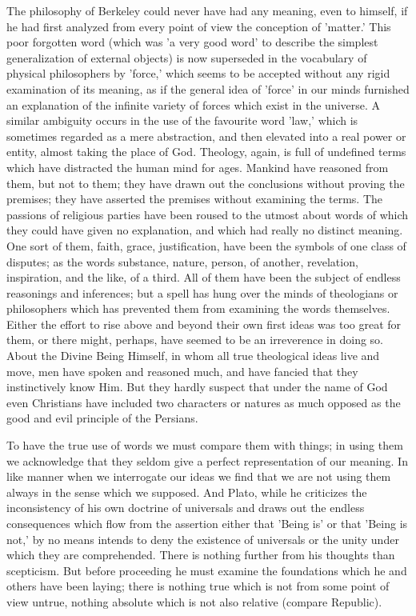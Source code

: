 The philosophy of Berkeley could never have had any meaning, even
to himself, if he had first analyzed from every point of view the
conception of 'matter.' This poor forgotten word (which was 'a very good
word' to describe the simplest generalization of external objects) is
now superseded in the vocabulary of physical philosophers by 'force,'
which seems to be accepted without any rigid examination of its meaning,
as if the general idea of 'force' in our minds furnished an explanation
of the infinite variety of forces which exist in the universe. A similar
ambiguity occurs in the use of the favourite word 'law,' which is
sometimes regarded as a mere abstraction, and then elevated into a real
power or entity, almost taking the place of God. Theology, again, is
full of undefined terms which have distracted the human mind for ages.
Mankind have reasoned from them, but not to them; they have drawn out
the conclusions without proving the premises; they have asserted the
premises without examining the terms. The passions of religious parties
have been roused to the utmost about words of which they could have
given no explanation, and which had really no distinct meaning. One sort
of them, faith, grace, justification, have been the symbols of one
class of disputes; as the words substance, nature, person, of another,
revelation, inspiration, and the like, of a third. All of them have been
the subject of endless reasonings and inferences; but a spell has hung
over the minds of theologians or philosophers which has prevented them
from examining the words themselves. Either the effort to rise above
and beyond their own first ideas was too great for them, or there might,
perhaps, have seemed to be an irreverence in doing so. About the Divine
Being Himself, in whom all true theological ideas live and move, men
have spoken and reasoned much, and have fancied that they instinctively
know Him. But they hardly suspect that under the name of God even
Christians have included two characters or natures as much opposed as
the good and evil principle of the Persians.

To have the true use of words we must compare them with things; in using
them we acknowledge that they seldom give a perfect representation of
our meaning. In like manner when we interrogate our ideas we find that
we are not using them always in the sense which we supposed. And Plato,
while he criticizes the inconsistency of his own doctrine of universals
and draws out the endless consequences which flow from the assertion
either that 'Being is' or that 'Being is not,' by no means intends
to deny the existence of universals or the unity under which they
are comprehended. There is nothing further from his thoughts than
scepticism. But before proceeding he must examine the foundations which
he and others have been laying; there is nothing true which is not from
some point of view untrue, nothing absolute which is not also relative
(compare Republic).

